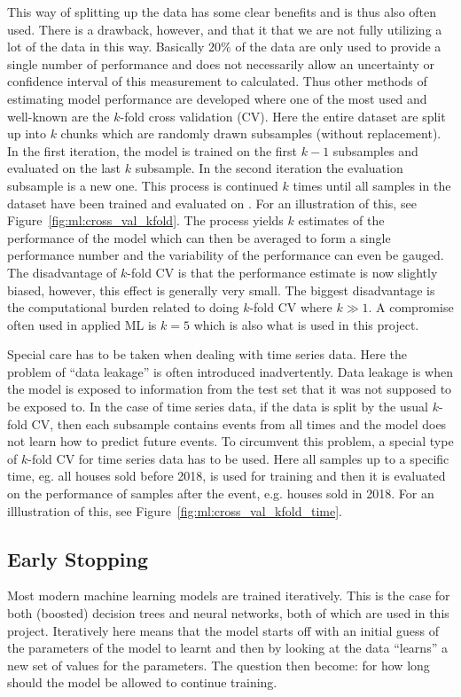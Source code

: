 \documentclass[a4paper, twoside, nobib]{tufte-book}
\newcommand{\q}[1]{``#1''}
\begin{document}
This way of splitting up the data has some clear benefits and is thus also often used. There is a drawback, however, and that it that we are not fully utilizing a lot of the data in this way. Basically $20\%$ of the data are only used to provide a single number of performance and does not necessarily allow an uncertainty or confidence interval of this measurement to calculated. Thus other methods of estimating model performance are developed where one of the most used and well-known are the $k$-fold cross validation (CV). Here the entire dataset are split up into $k$ chunks which are randomly drawn subsamples (without replacement). In the first iteration, the model is trained on the first $k-1$ subsamples and evaluated on the last $k$ subsample. In the second iteration the evaluation subsample is a new one. This process is continued $k$ times until all samples in the dataset have been trained and evaluated on \citep{hastieElementsStatisticalLearning2009}. For an illustration of this, see Figure~\ref{fig:ml:cross_val_kfold}. The process yields $k$ estimates of the performance of the model which can then be averaged to form a single performance number and the variability of the performance can even be gauged. The disadvantage of $k$-fold CV is that the performance estimate is now slightly biased, however, this effect is generally very small. The biggest disadvantage is the computational burden related to doing $k$-fold CV where $k\gg 1$. A compromise often used in applied ML is $k=5$ which is also what is used in this project.  

Special care has to be taken when dealing with time series data. Here the problem of \q{data leakage} is often introduced inadvertently. Data leakage is when the model is exposed to information from the test set that it was not supposed to be exposed to. In the case of time series data, if the data is split by the usual $k$-fold CV, then each subsample contains events from all times and the model does not learn how to predict future events. To circumvent this problem, a special type of $k$-fold CV for time series data has to be used. Here all samples up to a specific time, eg. all houses sold before 2018, is used for training and then it is evaluated on the performance of samples after the event, e.g. houses sold in 2018. For an illlustration of this, see Figure~\ref{fig:ml:cross_val_kfold_time}.


\subsection{Early Stopping}
\label{subsec:early_stopping}
Most modern machine learning models are trained iteratively. This is the case for both (boosted) decision trees and neural networks, both of which are used in this project. Iteratively here means that the model starts off with an initial guess of the parameters of the model to learnt and then by looking at the data \q{learns} a new set of values for the parameters. The question then become: for how long should the model be allowed to continue training. 
\end{document}
